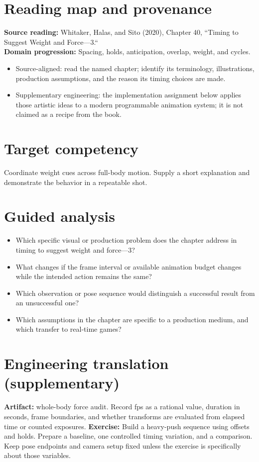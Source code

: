 \documentclass[10pt,letterpaper]{article}
\begin{document}
\makedoctitle
\makedocsummary

\section{Reading map and provenance}
\textbf{Source reading:} Whitaker, Halas, and Sito (2020), Chapter 40, ``Timing to Suggest Weight and Force—3.``\\
\textbf{Domain progression:} Spacing, holds, anticipation, overlap, weight, and cycles.
\begin{itemize}
\item Source-aligned: read the named chapter; identify its terminology, illustrations, production assumptions, and the reason its timing choices are made.
\item Supplementary engineering: the implementation assignment below applies those artistic ideas to a modern programmable animation system; it is not claimed as a recipe from the book.
\end{itemize}
\section{Target competency}
Coordinate weight cues across full-body motion. Supply a short explanation and demonstrate the behavior in a repeatable shot.
\section{Guided analysis}
\begin{itemize}
\item Which specific visual or production problem does the chapter address in timing to suggest weight and force—3?
\item What changes if the frame interval or available animation budget changes while the intended action remains the same?
\item Which observation or pose sequence would distinguish a successful result from an unsuccessful one?
\item Which assumptions in the chapter are specific to a production medium, and which transfer to real-time games?
\end{itemize}
\section{Engineering translation (supplementary)}
\textbf{Artifact:} whole-body force audit. Record fps as a rational value, duration in seconds, frame boundaries, and whether transforms are evaluated from elapsed time or counted exposures.
\textbf{Exercise:} Build a heavy-push sequence using offsets and holds. Prepare a baseline, one controlled timing variation, and a comparison. Keep pose endpoints and camera setup fixed unless the exercise is specifically about those variables.
\end{document}
